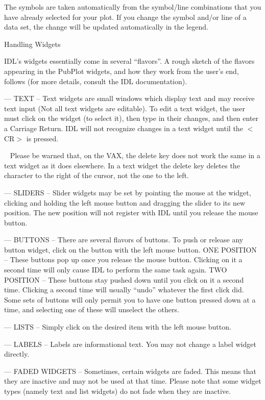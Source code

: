 The symbols are taken automatically from the symbol/line combinations that you
have already selected for your plot.  If you change the symbol and/or line of 
a data set, the change will be updated automatically in the legend.

\vskip 3mm \centerline{\rmtwelve Handling Widgets}

IDL's widgets essentially come in several ``flavors''.  A rough sketch of the
flavors appearing in the PubPlot widgets, and how they work from the user's 
end, follows (for more details, consult the IDL documentation).

\item{---} TEXT -- Text widgets are small windows which display text and may 
	receive text input (Not all text widgets are editable).  To edit a
	text widget, the user must click on the widget (to select it), then
	type in their changes, and then enter a Carriage Return.  IDL will not
	recognize changes in a text widget until the $<$CR$>$ is pressed.  
\item{\ } Please be warned that, on the VAX, the delete key does not work the
	same in a text widget as it does elsewhere.  In a text widget
	the delete key deletes the character to the right of the cursor, not
	the one to the left.
\item{---} SLIDERS -- Slider widgets may be set by pointing the mouse at the
	widget, clicking and holding the left mouse button and dragging the 
	slider to its new position.  The new position will not register with
	IDL until you release the mouse button.
\item{---} BUTTONS -- There are several flavors of buttons.  To push or release
	any button widget, click on the button with the left mouse button.
\itemitem{$\triangleright $} ONE POSITION -- These buttons pop up once you 
	release the mouse button.  Clicking on it a second time will only 
	cause IDL to perform the same task again.
\itemitem{$\triangleright $} TWO POSITION -- These buttons stay pushed down
	until you click on it a second time.  Clicking a second time will 
	usually ``undo'' whatever the first click did.  Some sets of buttons 
	will only permit you to have one button pressed down at a time, and 
	selecting one of these will unselect the others.
\item{---} LISTS -- Simply click on the desired item with the left mouse 
	button.
\item{---} LABELS -- Labels are informational text.  You may not change a label
	widget directly.
\item{---} FADED WIDGETS -- Sometimes, certain widgets are faded.  This means
	that they are inactive and may not be used at that time.  Please note 
	that some
	widget types (namely text and list widgets) do not fade when they are
	inactive.


\bye
